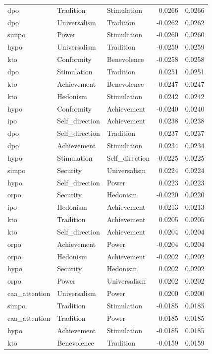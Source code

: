 \begin{tabular}{lllrr}
dpo & Tradition & Stimulation & 0.0266 & 0.0266 \\
dpo & Universalism & Tradition & -0.0262 & 0.0262 \\
simpo & Power & Stimulation & -0.0260 & 0.0260 \\
hypo & Universalism & Tradition & -0.0259 & 0.0259 \\
kto & Conformity & Benevolence & -0.0258 & 0.0258 \\
dpo & Stimulation & Tradition & 0.0251 & 0.0251 \\
kto & Achievement & Benevolence & -0.0247 & 0.0247 \\
kto & Hedonism & Stimulation & 0.0242 & 0.0242 \\
hypo & Conformity & Achievement & -0.0240 & 0.0240 \\
ipo & Self\_direction & Achievement & 0.0238 & 0.0238 \\
dpo & Self\_direction & Tradition & 0.0237 & 0.0237 \\
dpo & Achievement & Stimulation & 0.0234 & 0.0234 \\
hypo & Stimulation & Self\_direction & -0.0225 & 0.0225 \\
simpo & Security & Universalism & 0.0224 & 0.0224 \\
hypo & Self\_direction & Power & 0.0223 & 0.0223 \\
orpo & Security & Hedonism & -0.0220 & 0.0220 \\
ipo & Hedonism & Achievement & 0.0213 & 0.0213 \\
kto & Tradition & Achievement & 0.0205 & 0.0205 \\
kto & Self\_direction & Achievement & 0.0204 & 0.0204 \\
orpo & Achievement & Power & -0.0204 & 0.0204 \\
orpo & Hedonism & Achievement & -0.0202 & 0.0202 \\
hypo & Security & Hedonism & 0.0202 & 0.0202 \\
orpo & Power & Universalism & 0.0202 & 0.0202 \\
caa\_attention & Universalism & Power & 0.0200 & 0.0200 \\
simpo & Tradition & Stimulation & -0.0185 & 0.0185 \\
caa\_attention & Tradition & Power & 0.0185 & 0.0185 \\
hypo & Achievement & Stimulation & -0.0185 & 0.0185 \\
kto & Benevolence & Tradition & -0.0159 & 0.0159 \\

\end{tabular}

